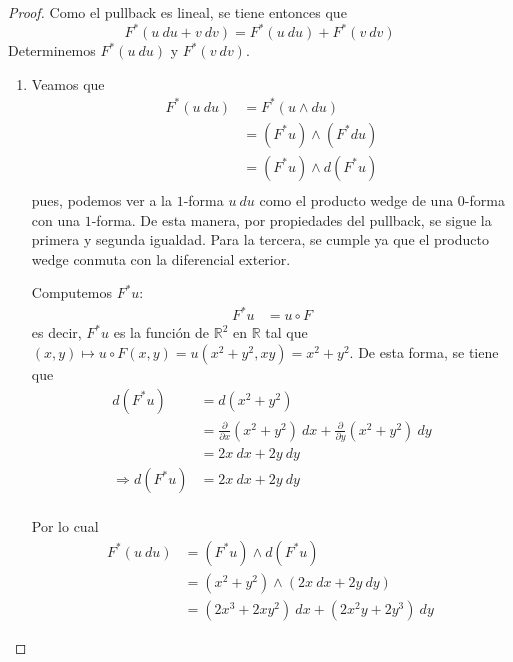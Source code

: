\documentclass[12pt]{report}
\theoremstyle{largebreak}
\begin{document}
    \begin{proof}
        Como el pullback es lineal, se tiene entonces que
        \begin{equation*}
            F^*(u\:du+v\:dv)=F^*(u\:du)+F^*(v\:dv)
        \end{equation*}
        Determinemos $F^*(u\:du)$ y $F^*(v\:dv)$.
        \begin{enumerate}
            \item Veamos que
            \begin{equation*}
                \begin{split}
                    F^*(u\:du)&=F^*(u\wedge du)\\
                    &=(F^*u)\wedge(F^*du)\\
                    &=(F^*u)\wedge d(F^*u)\\
                \end{split}
            \end{equation*}
            pues, podemos ver a la $1$-forma $u\:du$ como el producto wedge de una $0$-forma con una $1$-forma. De esta manera, por propiedades del pullback, se sigue la primera y segunda igualdad. Para la tercera, se cumple ya que el producto wedge conmuta con la diferencial exterior.
            
            Computemos $F^*u$:
            \begin{equation*}
                \begin{split}
                    F^*u&=u\circ F
                \end{split}
            \end{equation*}
            es decir, $F^*u$ es la función de $\mathbb{R}^2$ en $\mathbb{R}$ tal que $(x,y)\mapsto u\circ F(x,y)=u(x^2+y^2,xy)=x^2+y^2$. De esta forma, se tiene que
            \begin{equation*}
                \begin{split}
                    d(F^*u)&=d(x^2+y^2)\\
                    &=\frac{\partial }{\partial x}(x^2+y^2)\:dx+\frac{\partial }{\partial y}(x^2+y^2)\:dy\\
                    &=2x\:dx+2y\:dy\\
                    \Rightarrow d(F^*u)&=2x\:dx+2y\:dy\\
                \end{split}
            \end{equation*}
            
            Por lo cual
            \begin{equation*}
                \begin{split}
                    F^*(u\:du)&=(F^*u)\wedge d(F^*u)\\
                    &=(x^2+y^2)\wedge(2x\:dx+2y\:dy)\\
                    &=(2x^3+2xy^2)\:dx+(2x^2y+2y^3)\:dy\
                \end{split}
            \end{equation*}
            

\end{enumerate}
\end{proof}
\end{document}
